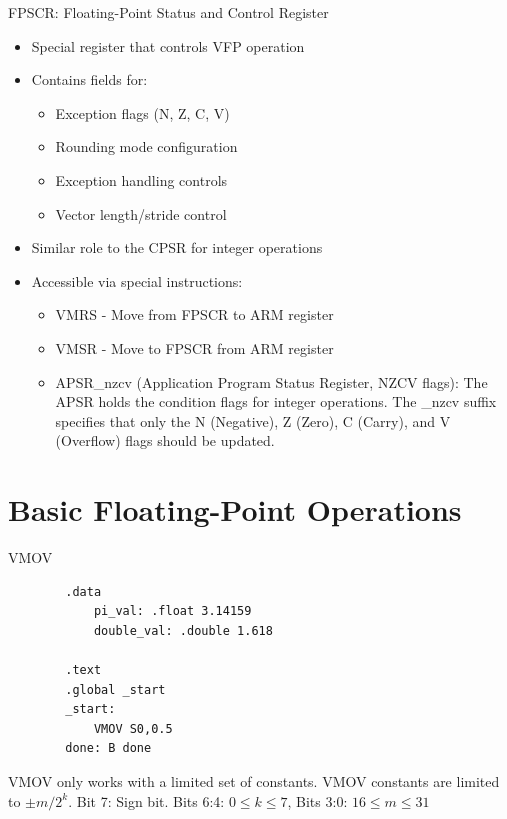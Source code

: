\documentclass[aspectratio=169]{beamer}
\begin{document}
\begin{frame}{FPSCR: Floating-Point Status and Control Register}
    \begin{itemize}
    \item Special register that controls VFP operation
    \item Contains fields for:
    \begin{itemize}
    \item Exception flags (N, Z, C, V)
    \item Rounding mode configuration
    \item Exception handling controls
    \item Vector length/stride control
    \end{itemize}
    \item Similar role to the CPSR for integer operations
    \item Accessible via special instructions:
    \begin{itemize}
    \item VMRS - Move from FPSCR to ARM register
    \item VMSR - Move to FPSCR from ARM register
    \item APSR\_nzcv (Application Program Status Register, NZCV flags): The APSR holds the condition flags for integer operations. The \_nzcv suffix specifies that only the N (Negative), Z (Zero), C (Carry), and V (Overflow) flags should be updated.
    \end{itemize}
    \end{itemize}
\end{frame}



\section{Basic Floating-Point Operations}
\begin{frame}
    \sectionpage
\end{frame}

\begin{frame}[fragile]{VMOV}

    \begin{verbatim}
        .data
            pi_val: .float 3.14159
            double_val: .double 1.618
        
        .text
        .global _start
        _start:
            VMOV S0,0.5
        done: B done
        \end{verbatim}

VMOV only works with a  limited set of constants. VMOV constants are limited to $\pm m/2^{k}$. Bit 7: Sign bit. Bits 6:4: $0 \leq k \leq 7$, Bits 3:0: $16 \leq m \leq 31$


\end{frame}
\end{document}
